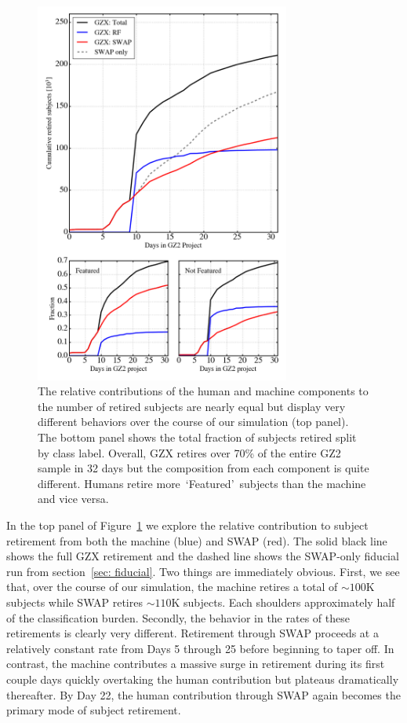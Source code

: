 \documentclass[twocolumn]{aastex6}
\newcommand{\feat}{`Featured'}
\begin{document}
\begin{figure}[t!]
\includegraphics[width=3.3in]{figures/GZ2_sup_PLPD5_p5_flipfeature2b_RF_accuracy_redo_raw_combo_GZX_component_contributions.png}
\caption{The relative contributions of the human and machine components to the number of retired subjects are nearly equal but display very different behaviors over the course of our simulation (top panel). The bottom panel shows the total fraction of subjects retired split by class label. Overall, GZX retires over 70\% of the entire GZ2 sample in 32 days but the composition from each component is quite different. Humans retire more~\feat~subjects than the machine and vice versa. \label{fig: gzx components}}
\end{figure}

In the top panel of Figure~\ref{fig: gzx components} we explore the relative 
contribution to subject retirement from both the machine (blue) and SWAP (red). 
The solid black line shows the full GZX retirement 
and the dashed line shows the SWAP-only fiducial run from section~\ref{sec: fiducial}. 
Two things are immediately obvious. 
First, we see that, over the course of our simulation, the machine retires a total of 
$\sim100$K subjects while SWAP retires $\sim110$K subjects. Each shoulders approximately
half of the classification burden. Secondly, the behavior in the rates of these
retirements is clearly very different. Retirement through SWAP proceeds at a relatively
constant rate from Days 5 through 25 before beginning to taper off. In contrast, 
the machine contributes a massive surge in retirement during its first couple days 
quickly overtaking the human contribution but plateaus dramatically thereafter.
By Day 22, the human contribution through SWAP  again becomes the primary mode 
of subject retirement. 
\end{document}
